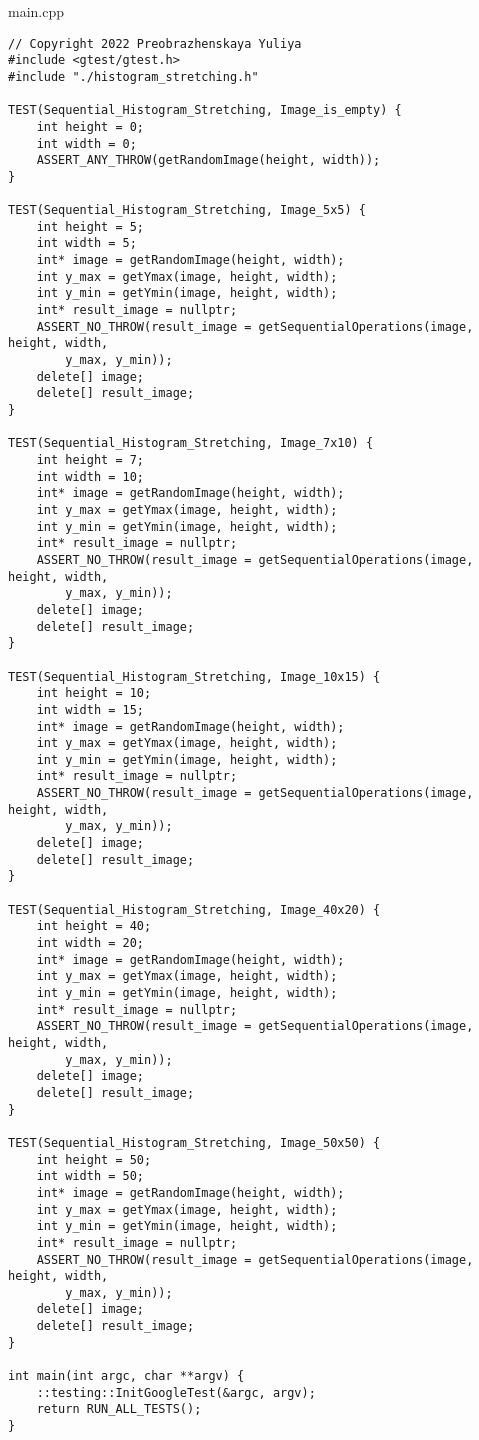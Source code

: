 \documentclass{report}
\begin{document}
main.cpp
\begin{lstlisting}
// Copyright 2022 Preobrazhenskaya Yuliya
#include <gtest/gtest.h>
#include "./histogram_stretching.h"

TEST(Sequential_Histogram_Stretching, Image_is_empty) {
    int height = 0;
    int width = 0;
    ASSERT_ANY_THROW(getRandomImage(height, width));
}

TEST(Sequential_Histogram_Stretching, Image_5x5) {
    int height = 5;
    int width = 5;
    int* image = getRandomImage(height, width);
    int y_max = getYmax(image, height, width);
    int y_min = getYmin(image, height, width);
    int* result_image = nullptr;
    ASSERT_NO_THROW(result_image = getSequentialOperations(image, height, width,
        y_max, y_min));
    delete[] image;
    delete[] result_image;
}

TEST(Sequential_Histogram_Stretching, Image_7x10) {
    int height = 7;
    int width = 10;
    int* image = getRandomImage(height, width);
    int y_max = getYmax(image, height, width);
    int y_min = getYmin(image, height, width);
    int* result_image = nullptr;
    ASSERT_NO_THROW(result_image = getSequentialOperations(image, height, width,
        y_max, y_min));
    delete[] image;
    delete[] result_image;
}

TEST(Sequential_Histogram_Stretching, Image_10x15) {
    int height = 10;
    int width = 15;
    int* image = getRandomImage(height, width);
    int y_max = getYmax(image, height, width);
    int y_min = getYmin(image, height, width);
    int* result_image = nullptr;
    ASSERT_NO_THROW(result_image = getSequentialOperations(image, height, width,
        y_max, y_min));
    delete[] image;
    delete[] result_image;
}

TEST(Sequential_Histogram_Stretching, Image_40x20) {
    int height = 40;
    int width = 20;
    int* image = getRandomImage(height, width);
    int y_max = getYmax(image, height, width);
    int y_min = getYmin(image, height, width);
    int* result_image = nullptr;
    ASSERT_NO_THROW(result_image = getSequentialOperations(image, height, width,
        y_max, y_min));
    delete[] image;
    delete[] result_image;
}

TEST(Sequential_Histogram_Stretching, Image_50x50) {
    int height = 50;
    int width = 50;
    int* image = getRandomImage(height, width);
    int y_max = getYmax(image, height, width);
    int y_min = getYmin(image, height, width);
    int* result_image = nullptr;
    ASSERT_NO_THROW(result_image = getSequentialOperations(image, height, width,
        y_max, y_min));
    delete[] image;
    delete[] result_image;
}

int main(int argc, char **argv) {
    ::testing::InitGoogleTest(&argc, argv);
    return RUN_ALL_TESTS();
}

\end{lstlisting}
\end{document}
